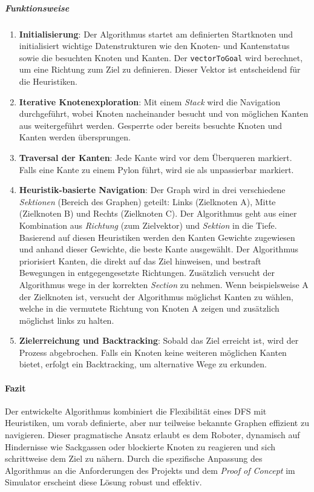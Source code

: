 \documentclass[main.tex]{subfiles} %
\begin{document}
\subparagraph{Funktionsweise}
\begin{enumerate}
  \item \textbf{Initialisierung}:
    Der Algorithmus startet am definierten Startknoten und
    initialisiert wichtige Datenstrukturen wie den Knoten- und
    Kantenstatus sowie die besuchten Knoten und Kanten. Der
    \texttt{vectorToGoal} wird berechnet, um eine Richtung zum Ziel
    zu definieren. Dieser Vektor ist entscheidend für die Heuristiken.

  \item \textbf{Iterative Knotenexploration}:
    Mit einem \textit{Stack} wird die Navigation durchgeführt, wobei
    Knoten nacheinander besucht und von möglichen Kanten aus
    weitergeführt werden. Gesperrte oder bereits besuchte Knoten und
    Kanten werden übersprungen.

  \item \textbf{Traversal der Kanten}:
    Jede Kante wird vor dem Überqueren markiert. Falls eine Kante zu
    einem Pylon führt, wird sie als unpassierbar markiert.

  \item \textbf{Heuristik-basierte Navigation}:
    Der Graph wird in drei verschiedene \textit{Sektionen} (Bereich
    des Graphen) geteilt: Links (Zielknoten A), Mitte (Zielknoten B)
    und Rechts (Zielknoten C).
    Der Algorithmus geht aus einer Kombination aus \textit{Richtung}
    (zum Zielvektor) und \textit{Sektion} in die Tiefe.
    Basierend auf diesen Heuristiken werden den Kanten Gewichte
    zugewiesen und anhand dieser Gewichte, die beste Kante ausgewählt.
    Der Algorithmus priorisiert Kanten, die direkt auf das Ziel
    hinweisen, und bestraft Bewegungen in entgegengesetzte
    Richtungen. Zusätzlich versucht der Algorithmus wege in der
    korrekten \textit{Section} zu nehmen. Wenn beispielsweise A der
    Zielknoten ist, versucht der Algorithmus möglichst Kanten zu
    wählen, welche in die vermutete Richtung von Knoten A zeigen und
    zusätzlich möglichst links zu halten.

  \item \textbf{Zielerreichung und Backtracking}:
    Sobald das Ziel erreicht ist, wird der Prozess abgebrochen. Falls
    ein Knoten keine weiteren möglichen Kanten bietet, erfolgt ein
    Backtracking, um alternative Wege zu erkunden.
\end{enumerate}

\paragraph{Fazit}

Der entwickelte Algorithmus kombiniert die Flexibilität eines DFS mit
Heuristiken, um vorab definierte, aber nur teilweise
bekannte Graphen effizient zu navigieren. Dieser pragmatische Ansatz
erlaubt es dem Roboter, dynamisch auf Hindernisse wie Sackgassen oder
blockierte Knoten zu reagieren und sich schrittweise dem Ziel zu
nähern. Durch die spezifische Anpassung des Algorithmus an die
Anforderungen des Projekts und dem \textit{Proof of Concept} im
Simulator erscheint diese Lösung robust und effektiv.
\end{document}
